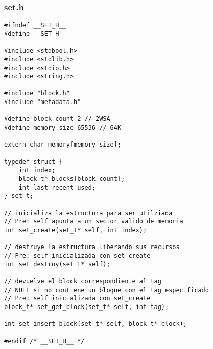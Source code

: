 \documentclass[a4paper,10pt]{article}
\begin{document}
  \subsubsection{set.h}
  \begin{verbatim}
#ifndef __SET_H__
#define __SET_H__

#include <stdbool.h>
#include <stdlib.h>
#include <stdio.h>
#include <string.h>

#include "block.h"
#include "metadata.h"

#define block_count 2 // 2WSA
#define memory_size 65536 // 64K

extern char memory[memory_size];

typedef struct {
	int index;
	block_t* blocks[block_count];
	int last_recent_used;
} set_t;

// inicializa la estructura para ser utilziada
// Pre: self apunta a un sector valido de memoria
int set_create(set_t* self, int index);

// destruye la estructura liberando sus recursos
// Pre: self inicializada con set_create
int set_destroy(set_t* self);

// devuelve el block correspondiente al tag
// NULL si no contiene un bloque con el tag especificado
// Pre: self inicializada con set_create
block_t* set_get_block(set_t* self, int tag);

int set_insert_block(set_t* self, block_t* block);

#endif /* __SET_H__ */

  \end{verbatim}
\end{document}
